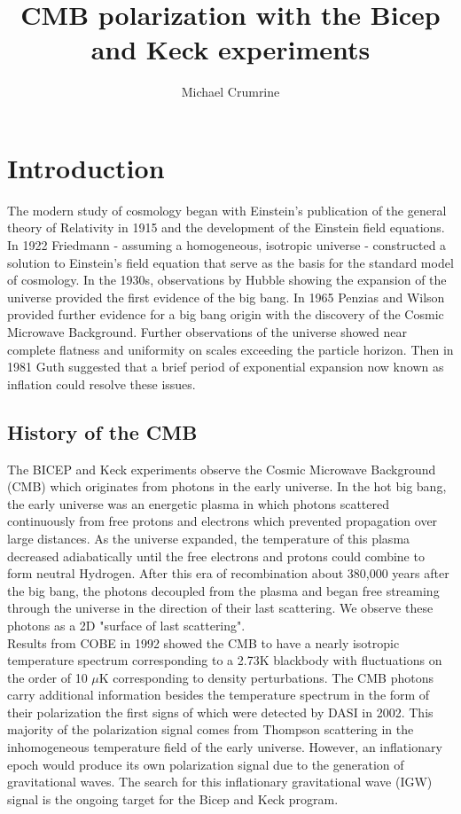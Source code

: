 \documentclass[12pt]{article}
\begin{document}
\author{Michael Crumrine}
\title{CMB polarization with the Bicep and Keck experiments}
\maketitle


\section{Introduction}
The modern study of cosmology began with Einstein's publication of the general
theory of Relativity in 1915 \cite{cite:Einstein} and the development of the
Einstein field equations. In 1922 Friedmann\cite{cite:Friedmann} - assuming a homogeneous, isotropic
universe - constructed a solution to Einstein's field equation that serve as
the basis for the standard model of cosmology. In the
1930s, observations by Hubble \cite{cite:Hubble} showing the expansion of the
universe provided the first evidence of the big bang. In 1965 Penzias and
Wilson\cite{cite:Penzias} provided further evidence for a big bang origin with the discovery of
the Cosmic Microwave Background. Further observations of
the universe showed near complete flatness and uniformity on scales exceeding the
particle horizon. Then in 1981 Guth\cite{cite:Guth} suggested that a brief period of exponential
expansion now known as inflation could resolve these issues.

\subsection{History of the CMB}
The BICEP and Keck experiments observe the Cosmic Microwave Background (CMB)
which originates from photons in the early universe. In the hot big bang, the
early universe was an energetic plasma in which photons scattered continuously
from free protons and electrons which prevented propagation over large
distances. As the universe expanded, the temperature of this plasma decreased
adiabatically until the free electrons and protons could combine to form
neutral Hydrogen. After this era of recombination about 380,000 years after
the big bang, the photons decoupled from the plasma and began free streaming
through the universe in the direction of their last scattering. We observe
these photons as a 2D "surface of last scattering". 
\\
Results from COBE in 1992\cite{cite:COBE} showed the CMB to have a nearly
isotropic temperature spectrum corresponding to a 2.73K blackbody with
fluctuations on the order of 10 $\mu$K corresponding to density perturbations.
The CMB photons carry additional information besides the temperature spectrum
in the form of their polarization the first signs of which were detected by
DASI\cite{cite:DASI} in 2002. This majority of the polarization signal comes
from Thompson scattering in the inhomogeneous temperature field of the early
universe. However, an inflationary epoch would produce its own polarization
signal due to the generation of gravitational waves. The search for this
inflationary gravitational wave (IGW) signal is the ongoing target for the
Bicep and Keck program.
\end{document}

